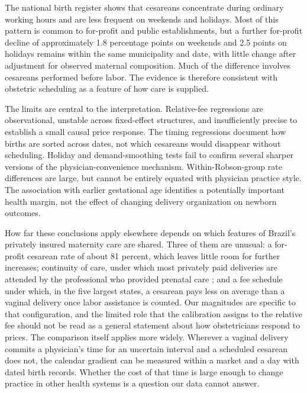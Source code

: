 \documentclass[12pt]{article}
\begin{document}
The national birth register shows that cesareans concentrate during ordinary working hours and are less frequent on weekends and holidays. Most of this pattern is common to for-profit and public establishments, but a further for-profit decline of approximately 1.8 percentage points on weekends and 2.5 points on holidays remains within the same municipality and date, with little change after adjustment for observed maternal composition. Much of the difference involves cesareans performed before labor. The evidence is therefore consistent with obstetric scheduling as a feature of how care is supplied.

The limits are central to the interpretation. Relative-fee regressions are observational, unstable across fixed-effect structures, and insufficiently precise to establish a small causal price response. The timing regressions document how births are sorted across dates, not which cesareans would disappear without scheduling. Holiday and demand-smoothing tests fail to confirm several sharper versions of the physician-convenience mechanism. Within-Robson-group rate differences are large, but cannot be entirely equated with physician practice style. The association with earlier gestational age identifies a potentially important health margin, not the effect of changing delivery organization on newborn outcomes.

How far these conclusions apply elsewhere depends on which features of Brazil's privately insured maternity care are shared. Three of them are unusual: a for-profit cesarean rate of about 81 percent, which leaves little room for further increases; continuity of care, under which most privately paid deliveries are attended by the professional who provided prenatal care \citep{domingues2014}; and a fee schedule under which, in the five largest states, a cesarean pays less on average than a vaginal delivery once labor assistance is counted. Our magnitudes are specific to that configuration, and the limited role that the calibration assigns to the relative fee should not be read as a general statement about how obstetricians respond to prices. The comparison itself applies more widely. Wherever a vaginal delivery commits a physician's time for an uncertain interval and a scheduled cesarean does not, the calendar gradient can be measured within a market and a day with dated birth records. Whether the cost of that time is large enough to change practice in other health systems is a question our data cannot answer.
\end{document}
